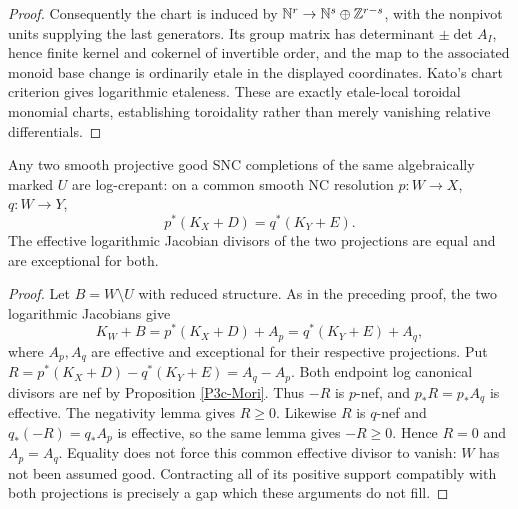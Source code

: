 \begin{proof}
Consequently the chart is induced by
$\mathbb N^r\to\mathbb N^s\oplus\mathbb Z^{r-s}$, with the nonpivot
units supplying the last generators. Its group matrix has
determinant $\pm\det A_I$, hence finite kernel and cokernel
of invertible order, and the map to the associated monoid
base change is ordinarily etale in the displayed coordinates.
Kato's chart criterion gives logarithmic etaleness. These
are exactly etale-local toroidal monomial charts, establishing
toroidality rather than merely vanishing relative differentials.
\end{proof}

\begin{proposition}\label{P3c-crepant}
Any two smooth projective good SNC completions of the same
algebraically marked $U$ are log-crepant: on a common smooth
NC resolution $p:W\to X$, $q:W\to Y$,
\[
 p^*(K_X+D)=q^*(K_Y+E).
\]
The effective logarithmic Jacobian divisors of the two
projections are equal and are exceptional for both.
\end{proposition}
\begin{proof}
Let $B=W\setminus U$ with reduced structure. As in the preceding
proof, the two logarithmic Jacobians give
\[
 K_W+B=p^*(K_X+D)+A_p=q^*(K_Y+E)+A_q,
\]
where $A_p,A_q$ are effective and exceptional for their respective
projections. Put
$R=p^*(K_X+D)-q^*(K_Y+E)=A_q-A_p$.
Both endpoint log canonical divisors are nef by Proposition
\ref{P3c-Mori}. Thus $-R$ is $p$-nef, and
$p_*R=p_*A_q$ is effective. The negativity lemma gives $R\geq0$.
Likewise $R$ is $q$-nef and $q_*(-R)=q_*A_p$ is effective, so
the same lemma gives $-R\geq0$. Hence $R=0$ and $A_p=A_q$.
Equality does not force this common effective divisor to vanish:
$W$ has not been assumed good. Contracting all of its positive
support compatibly with both projections is precisely a gap
which these arguments do not fill.
\end{proof}

